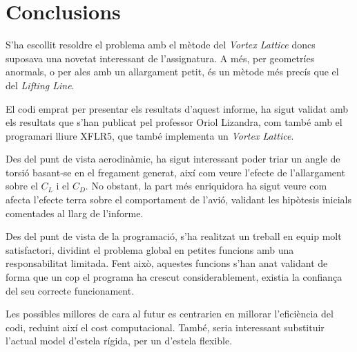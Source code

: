 \chapter{Conclusions}

S'ha escollit resoldre el problema amb el mètode del \textit{Vortex Lattice} doncs suposava una novetat interessant de l'assignatura. A més, per geometríes anormals, o per ales amb un allargament petit, és un mètode més precís que el del \textit{Lifting Line}. 

El codi emprat per presentar els resultats d'aquest informe, ha sigut validat amb els resultats que s'han publicat pel professor Oriol Lizandra, com també amb el programari lliure XFLR5, que també implementa un \textit{Vortex Lattice}.

Des del punt de vista aerodinàmic, ha sigut interessant poder triar un angle de torsió basant-se en el fregament generat, així com veure l'efecte de l'allargament sobre el $C_L$ i el $C_D$. No obstant, la part més enriquidora ha sigut  veure com afecta l'efecte terra sobre el comportament de l'avió, validant les hipòtesis inicials comentades al llarg de l'informe.

Des del punt de vista de la programació, s'ha realitzat un treball en equip molt satisfactori, dividint el problema global en petites funcions amb una responsabilitat limitada. Fent això, aquestes funcions s'han anat validant de forma que un cop el programa ha crescut considerablement, existia la confiança del seu correcte funcionament.

Les possibles millores de cara al futur es centrarien en millorar l'eficiència del codi, reduint així el cost computacional. També, seria interessant substituir l'actual model d'estela rígida, per un d'estela flexible.
